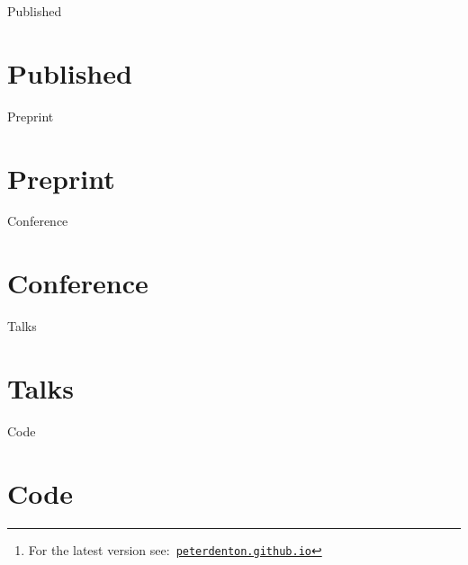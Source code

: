 \documentclass[a4paper,12pt]{article}
\title{\myTitle}
\author{\myName}
\date{\small Updated: \today\footnote{For the latest version see:\ \href{http://peterdenton.github.io}{\tt peterdenton.github.io}}}
\newcommand\myBib[1]{
\begin{btSect}{#1}
\section*{#1}
\btPrintAll
\end{btSect}}
\begin{document}
\makeatletter
\let\@fnsymbol\@arabic
\makeatother

\maketitle



\myBib{Published}
\myBib{Preprint}
\myBib{Conference}
\myBib{Talks}
\myBib{Code}
\end{document}
